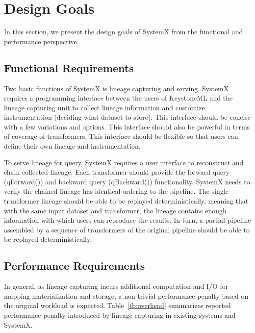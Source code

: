\documentclass{sig-alternate}
\begin{document}
\section{Design Goals}
\label{sec:Req}
In this section, we present the design goals of SystemX from the functional and performance perspective.

\subsection{Functional Requirements}
Two basic functions of SystemX is lineage capturing and serving.
SystemX requires a programming interface between the users of KeystoneML and the lineage capturing unit to 
collect lineage information and customize instrumentation (deciding what dataset to store). 
This interface should be concise with a few variations and options.
This interface should also be powerful in terms of coverage of transformers.
This interface should be flexible so that users can define their own lineage and instrumentation.

To serve lineage for query, SystemX requires a user interface to reconstruct and chain collected lineage.
Each transformer should provide the forward query (qForward()) and backward query (qBackward()) functionality.
SystemX needs to verify the chained lineage has identical ordering to the pipeline.
The single transformer lineage should be able to be replayed deterministically, meaning that with the same input dataset and transformer,
the lineage contains enough information with which users can reproduce the results.
In turn, a partial pipeline assembled by a sequence of transformers of the original pipeline should be able to be replayed deterministically.

\subsection{Performance Requirements}
\label{sec:Req-Perf}
In general, as lineage capturing incurs additional computation and I/O for mapping materialization and storage, a non-trivial performance
penalty based on the original workload is expected. 
Table~\ref{tb:overhead} summarizes reported performance penalty introduced by lineage capturing in existing systems and SystemX. 
\end{document}
